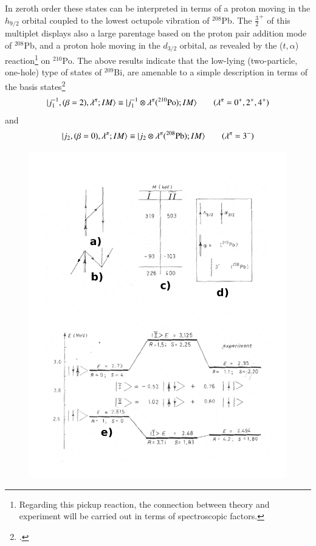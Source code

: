In zeroth order these states can be interpreted in terms of a proton moving in the $h_{9/2}$ orbital coupled to the lowest octupole vibration of $^{208}$Pb. The $\frac{3}{2}^+$ of this multiplet displays also a large parentage based on the proton pair addition mode of $^{208}$Pb,
and a proton hole moving in the $d_{3/2}$ orbital, as revealed by the ($t,\alpha$) reaction\footnote{Regarding this pickup reaction, the connection between theory and experiment will be carried out in terms of spectroscopic factors.} 
on $^{210}$Po. 
The above results indicate that the low-lying (two-particle, one-hole) type of states 
of $^{209}$Bi, are amenable to a simple description in terms of the basis states\footnote{\cite{Barnes:72}.} 
  \begin{align}\label{eqC1A87} 
   |{j^{-1}_1,(\beta=2),\lambda^{\pi};IM} \rangle\equiv |{j_1^{-1}\otimes \lambda^\pi(^{210}\text{Po});IM} \rangle\qquad(\lambda^{\pi}=0^+,2^+,4^+)
    \end{align} 
and 
  \begin{align}\label{eqC1A88} 
   |{j_2,(\beta=0),\lambda^{\pi};IM} \rangle\equiv |{j_2\otimes \lambda^\pi(^{208}\text{Pb});IM} \rangle\qquad(\lambda^{\pi}=3^-)
    \end{align} 
         \begin{figure}
         \centerline {
         \includegraphics*[width=12cm]{introduccion/figs/fig24a}
         }
         \end{figure}
